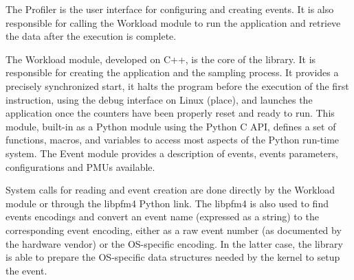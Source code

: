 The Profiler is the user interface for configuring and creating events.
It is also responsible for calling the Workload module to run the application and retrieve the data after the execution is complete.

The Workload module, developed on C++, is the core of the library.
It is responsible for creating the application and the sampling process.
It provides a precisely synchronized start, it halts the program before the execution of the first instruction, using the debug interface on Linux (place), and launches the application once the counters have been properly reset and ready to run.
This module, built-in as a Python module using the Python C API, defines a set of functions, macros, and variables to access most aspects of the Python run-time system.
The Event module provides a description of events, events parameters, configurations and PMUs available.

System calls for reading and event creation are done directly by the Workload module or through the libpfm4 Python link. 
The libpfm4 is also used to find events encodings and convert an event name (expressed as a string) to the corresponding event encoding, either as a raw event number (as documented by the hardware vendor) or the OS-specific encoding.
In the latter case, the library is able to prepare the OS-specific data structures needed by the kernel to setup the event.

